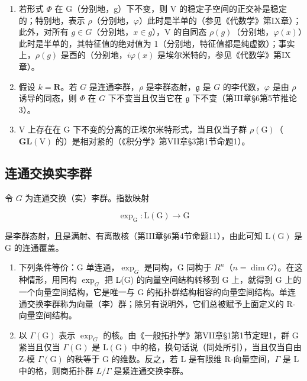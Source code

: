 \begin{enumerate}
\def\labelenumi{\alph{enumi})}
\setcounter{enumi}{1}
\item
  若形式 \(\varPhi\) 在 G（分别地，g）下不变，则 V 的稳定子空间的正交补是稳定的；特别地，表示 \(\rho\)（分别地，\(\varphi\)）此时是半单的（参见《代数学》第IX章）；此外，对所有 \(g \in G\)（分别地，\(x \in g\)），V 的自同态 \(\rho(g)\)（分别地，\(\varphi(x)\)）此时是半单的，其特征值的绝对值为 1（分别地，特征值都是纯虚数）；事实上，\(\rho(g)\) 是酉的（分别地，\(i\varphi(x)\) 是埃尔米特的，参见《代数学》第IX章）。
\item
  假设 \(k = \mathbf{R}\)。若 \(G\) 是连通李群，\(\rho\) 是李群态射，\(\mathfrak{g}\) 是 \(G\) 的李代数，\(\varphi\) 是由 \(\rho\) 诱导的同态，则 \(\varPhi\) 在 \(G\) 下不变当且仅当它在 \(\mathfrak{g}\) 下不变（第III章§6第5节推论3）。
\item
  V 上存在在 G 下不变的分离的正埃尔米特形式，当且仅当子群 \(\rho(\mathrm{G})\)（\(\mathbf{GL}(\mathrm{V})\) 的）是相对紧的（《积分学》第VII章§3第1节命题1）。
\end{enumerate}

\subsection{连通交换实李群}

令 \(G\) 为连通交换（实）李群。指数映射

\[
\exp_ {\mathrm{G}}: \mathrm{L} (\mathrm{G}) \to \mathrm{G}
\]

是李群态射，且是满射、有离散核（第III章§6第4节命题11），由此可知 \(\mathrm{L}(\mathrm{G})\) 是 \(\mathrm{G}\) 的连通覆盖。

\begin{enumerate}
\def\labelenumi{\alph{enumi})}
\item
  下列条件等价：G 单连通，\(\exp_{G}\) 是同构，G 同构于 \(R^{n}\)（\(n = \dim G\)）。在这种情形，用同构 \(\exp_{G}\) 把 L(G) 的向量空间结构转移到 G 上，就得到 G 上的一个向量空间结构，它是唯一与 G 的拓扑群结构相容的向量空间结构。单连通交换李群称为向量（李）群；除另有说明外，它们总被赋予上面定义的 R-向量空间结构。
\item
  以 \(\Gamma(\mathrm{G})\) 表示 \(\exp_{G}\) 的核。由《一般拓扑学》第VII章§1第1节定理1，群 G 紧当且仅当 \(\Gamma(\mathrm{G})\) 是 \(\mathrm{L}(\mathrm{G})\) 中的格，换句话说（同处所引），当且仅当自由 Z-模 \(\Gamma(\mathrm{G})\) 的秩等于 G 的维数。反之，若 L 是有限维 R-向量空间，\(\Gamma\) 是 L 中的格，则商拓扑群 \(L/\Gamma\) 是紧连通交换李群。
\end{enumerate}

